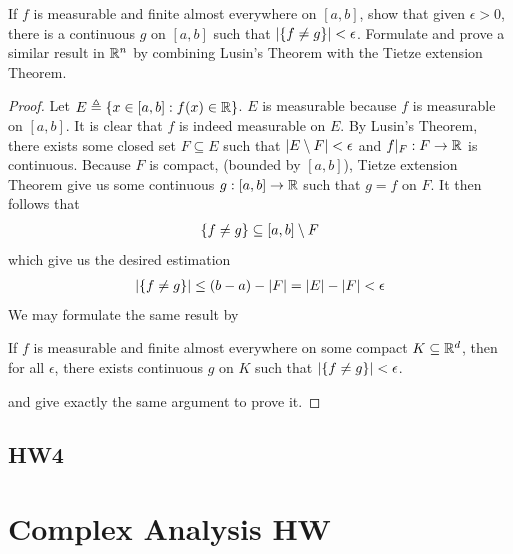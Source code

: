 \documentclass{report}
\begin{document}
\begin{question}{}{}
  If $f$ is measurable and finite almost everywhere on $[a,b]$, show that given $\epsilon >0$, there is a continuous $g$ on $[a,b]$ such that $\left|\{ f\neq g \}\right|< \epsilon $. Formulate and prove a similar result in $\mathbb{R}^n$ by combining Lusin's Theorem with the Tietze extension Theorem. 
\end{question}
\begin{proof}
Let $E\triangleq \{ x\in [a,b]:f(x)\in\mathbb{R} \}$. $E$ is measurable because  $f$ is measurable on $[a,b]$. It is clear that $f$ is indeed measurable on $E$. By Lusin's Theorem, there exists some closed set $F\subseteq E$ such that  $\left|E\setminus F\right|<\epsilon $ and $f|_F:F\rightarrow \mathbb{R}$ is continuous. Because $F$ is compact,  (bounded by $[a,b]$), Tietze extension Theorem give us some continuous $g:[a,b]\rightarrow \mathbb{R}$ such that  $g=f$ on $F$. It then follows that 
\begin{align*}
\{ f\neq g \}\subseteq [a,b]\setminus F
\end{align*}
which give us the desired estimation 
\begin{align*}
\left|\{ f\neq g \}\right|\leq (b-a)-\left|F\right|=\left|E\right|-\left|F\right|<\epsilon 
\end{align*}
We may formulate the same result by 
\begin{center}
   \begin{minipage}{0.9\linewidth}  
       \centering
       If $f$ is measurable and finite almost everywhere on some compact $K \subseteq \mathbb{R}^d$, then for all $\epsilon $, there exists continuous $g$ on  $K$ such that  $\left|\{ f\neq g \}\right|<\epsilon $. 
   \end{minipage}
\end{center}
and give exactly the same argument to prove it. 
\end{proof}
\section{HW4}

\chapter{Complex Analysis HW}
\end{document}

